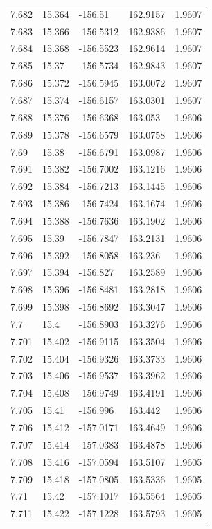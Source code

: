 \begin{tabular}{lllll}
7.682 & 15.364 & -156.51 & 162.9157 & 1.9607 \\
7.683 & 15.366 & -156.5312 & 162.9386 & 1.9607 \\
7.684 & 15.368 & -156.5523 & 162.9614 & 1.9607 \\
7.685 & 15.37 & -156.5734 & 162.9843 & 1.9607 \\
7.686 & 15.372 & -156.5945 & 163.0072 & 1.9607 \\
7.687 & 15.374 & -156.6157 & 163.0301 & 1.9607 \\
7.688 & 15.376 & -156.6368 & 163.053 & 1.9606 \\
7.689 & 15.378 & -156.6579 & 163.0758 & 1.9606 \\
7.69 & 15.38 & -156.6791 & 163.0987 & 1.9606 \\
7.691 & 15.382 & -156.7002 & 163.1216 & 1.9606 \\
7.692 & 15.384 & -156.7213 & 163.1445 & 1.9606 \\
7.693 & 15.386 & -156.7424 & 163.1674 & 1.9606 \\
7.694 & 15.388 & -156.7636 & 163.1902 & 1.9606 \\
7.695 & 15.39 & -156.7847 & 163.2131 & 1.9606 \\
7.696 & 15.392 & -156.8058 & 163.236 & 1.9606 \\
7.697 & 15.394 & -156.827 & 163.2589 & 1.9606 \\
7.698 & 15.396 & -156.8481 & 163.2818 & 1.9606 \\
7.699 & 15.398 & -156.8692 & 163.3047 & 1.9606 \\
7.7 & 15.4 & -156.8903 & 163.3276 & 1.9606 \\
7.701 & 15.402 & -156.9115 & 163.3504 & 1.9606 \\
7.702 & 15.404 & -156.9326 & 163.3733 & 1.9606 \\
7.703 & 15.406 & -156.9537 & 163.3962 & 1.9606 \\
7.704 & 15.408 & -156.9749 & 163.4191 & 1.9606 \\
7.705 & 15.41 & -156.996 & 163.442 & 1.9606 \\
7.706 & 15.412 & -157.0171 & 163.4649 & 1.9606 \\
7.707 & 15.414 & -157.0383 & 163.4878 & 1.9606 \\
7.708 & 15.416 & -157.0594 & 163.5107 & 1.9605 \\
7.709 & 15.418 & -157.0805 & 163.5336 & 1.9605 \\
7.71 & 15.42 & -157.1017 & 163.5564 & 1.9605 \\
7.711 & 15.422 & -157.1228 & 163.5793 & 1.9605 \\

\end{tabular}

